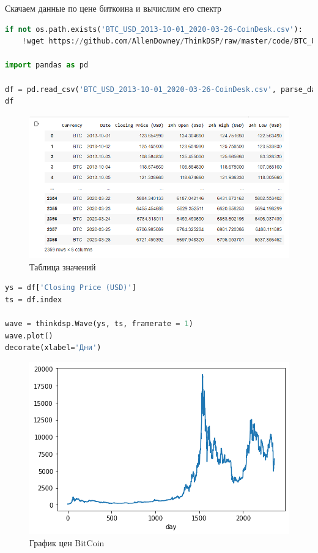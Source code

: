 Скачаем данные по цене биткоина и вычислим его спектр

\begin{lstlisting}[language=Python]
if not os.path.exists('BTC_USD_2013-10-01_2020-03-26-CoinDesk.csv'):
    !wget https://github.com/AllenDowney/ThinkDSP/raw/master/code/BTC_USD_2013-10-01_2020-03-26-CoinDesk.csv
    
import pandas as pd

df = pd.read_csv('BTC_USD_2013-10-01_2020-03-26-CoinDesk.csv', parse_dates=[0])
df
\end{lstlisting}

\begin{figure}[H]
	\begin{center}
		\includegraphics[scale=1]{fig/lab04/lab04_07.png}
		\caption{Таблица значений}
	\end{center}
\end{figure}

\begin{lstlisting}[language=Python]
ys = df['Closing Price (USD)']
ts = df.index

wave = thinkdsp.Wave(ys, ts, framerate = 1)
wave.plot()
decorate(xlabel='Дни')
\end{lstlisting}

\begin{figure}[H]
	\begin{center}
		\includegraphics[scale=1]{fig/lab04/lab04_08.png}
		\caption{График цен BitCoin}
	\end{center}
\end{figure}

